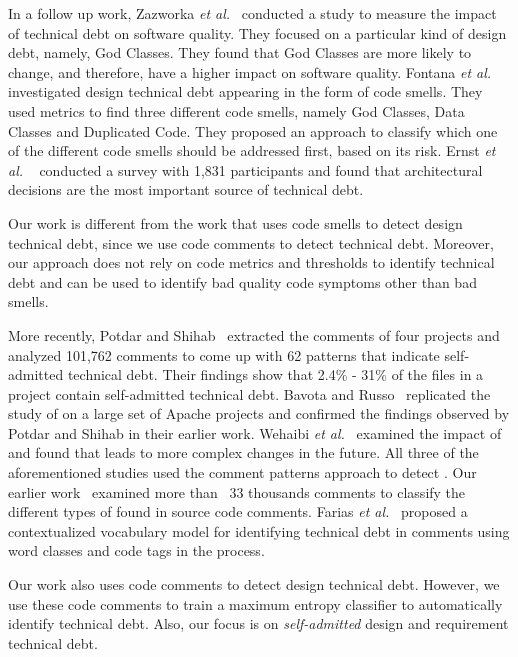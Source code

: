 In a follow up work, Zazworka \textit{et al.}~\cite{Zazworka2011MTD} conducted a study to measure the impact of technical debt on software quality. They focused on a particular kind of design debt, namely, God Classes. They found that God Classes are more likely to change, and therefore, have a higher impact on software quality. Fontana \textit{et al.}~\cite{Fontana2012MTD} investigated design technical debt appearing in the form of code smells. They used metrics to find three different code smells, namely God Classes, Data Classes and Duplicated Code. They proposed an approach to classify which one of the different code smells should be addressed first, based on its risk. Ernst \textit{et al.} ~\cite{Ernst2015FSE} conducted a survey with 1,831 participants and found that architectural decisions are the most important source of technical debt.

Our work is different from the work that uses code smells to detect design technical debt, since we use code comments to detect technical debt. Moreover, our approach does not rely on code metrics and thresholds to identify technical debt and can be used to identify bad quality code symptoms other than bad smells.

More recently, Potdar and Shihab~\cite{Potdar2014ICSME} extracted the comments of four projects and analyzed 101,762 comments to come up with 62  patterns that indicate self-admitted technical debt. Their findings show that 2.4\% - 31\% of the files in a project contain self-admitted technical debt. Bavota and Russo~\cite{bavota2016MSR} replicated the study of \SATD on a large set of Apache projects and confirmed the findings observed by Potdar and Shihab in their earlier work. Wehaibi \textit{et al.}~\cite{wehaibi2016SANER} examined the impact of \SATD and found that \SATD leads to more complex changes in the future. All three of the aforementioned studies used the comment patterns approach to detect \SATD. Our earlier work~\cite{Maldonado2015MTD} examined more than ~33 thousands comments to classify the different types of \SATD found in source code comments. Farias \textit{et al.}~\cite{Farias2015MTD} proposed a contextualized vocabulary model for identifying technical debt in comments using word classes and code tags in the process. 

Our work also uses code comments to detect design technical debt. However, we use these code comments to train a maximum entropy classifier to automatically identify technical debt. Also, our focus is on \emph{self-admitted} design and requirement technical debt.

